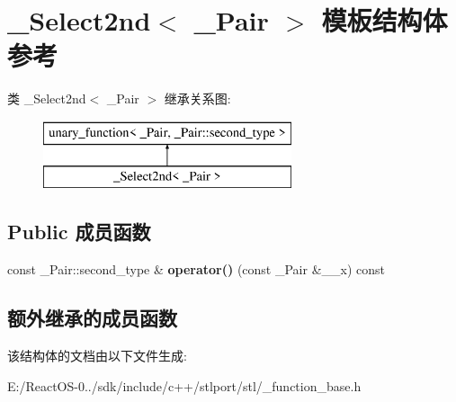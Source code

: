 \hypertarget{struct___select2nd}{}\section{\+\_\+\+Select2nd$<$ \+\_\+\+Pair $>$ 模板结构体 参考}
\label{struct___select2nd}
类 \+\_\+\+Select2nd$<$ \+\_\+\+Pair $>$ 继承关系图\+:\begin{figure}[H]
\begin{center}
\leavevmode
\includegraphics[height=2.000000cm]{struct___select2nd}
\end{center}
\end{figure}
\subsection*{Public 成员函数}
\begin{DoxyCompactItemize}
\item 
\mbox{\label{struct___select2nd_a442595090b65cf3222a02446eeded53d}} 
const \+\_\+\+Pair\+::second\+\_\+type \& {\bfseries operator()} (const \+\_\+\+Pair \&\+\_\+\+\_\+x) const
\end{DoxyCompactItemize}
\subsection*{额外继承的成员函数}


该结构体的文档由以下文件生成\+:\begin{DoxyCompactItemize}
\item 
E\+:/\+React\+O\+S-\/0../sdk/include/c++/stlport/stl/\+\_\+function\+\_\+base.\+h\end{DoxyCompactItemize}
